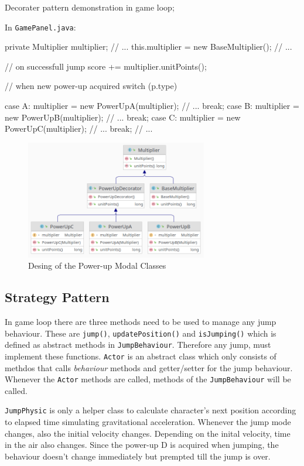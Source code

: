 \documentclass[a4paper]{article}
\begin{document}
Decorater pattern demonstration in game loop;

In \texttt{GamePanel.java}:

\begin{javacode}
private Multiplier multiplier;
// ...
this.multiplier = new BaseMultiplier();
// ...

// on successfull jump
score += multiplier.unitPoints();

// when new power-up acquired
switch (p.type) {
    case A:
        multiplier = new PowerUpA(multiplier);
        // ...
    break;
    case B:
        multiplier = new PowerUpB(multiplier);
        // ...
    break;
    case C:
        multiplier = new PowerUpC(multiplier);
        // ...
    break;
    // ...

}
\end{javacode}


\begin{figure}[htbp]
\centering
\includegraphics[width=300px]{org-img/Design_Explanation/2021-10-28_02-08-52_screenshot.png}
\caption{Desing of the Power-up Modal Classes}
\end{figure}


\newpage
\subsection*{Strategy Pattern}
\label{sec:orgb94f953}

In game loop there are three methods need to be used to manage any jump behaviour.
These are \texttt{jump()}, \texttt{updatePosition()} and \texttt{isJumping()} which is defined as abstract methods in \texttt{JumpBehaviour}.
Therefore any jump, must implement these functions.
\texttt{Actor} is an abstract class which only consists of methdos that calls \emph{behaviour} methods and getter/setter for the jump behaviour.
Whenever the \texttt{Actor} methods are called, methods of the \texttt{JumpBehaviour} will be called.


\texttt{JumpPhysic} is only a helper class to calculate character's next position according to elapsed time simulating gravitational acceleration.
Whenever the jump mode changes, also the initial velocity changes.
Depending on the inital velocity, time in the air also changes.
Since the power-up D is acquired when jumping, the behaviour doesn't change immediately but prempted till the jump is over.
\end{document}
